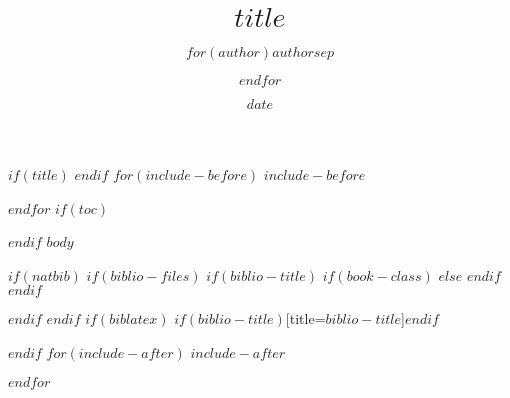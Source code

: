 \documentclass[professionalfonts, 12pt, default, cjk]{beamer}
\title{$title$}
\author{$for(author)$$author$$sep$ \and $endfor$}
\date{$date$}
\begin{document}
$if(title)$
\frame{\titlepage}
$endif$
$for(include-before)$
$include-before$

$endfor$
$if(toc)$
\begin{frame}
\tableofcontents[hideallsubsections]
\end{frame}

$endif$
$body$

$if(natbib)$
$if(biblio-files)$
$if(biblio-title)$
$if(book-class)$
\renewcommand\bibname{$biblio-title$}
$else$
\renewcommand\refname{$biblio-title$}
$endif$
$endif$


$endif$
$endif$
$if(biblatex)$
\printbibliography$if(biblio-title)$[title=$biblio-title$]$endif$

$endif$
$for(include-after)$
$include-after$

$endfor$
\end{document}
